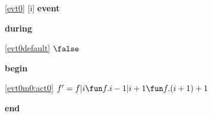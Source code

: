 \noindent \ref{evt0} [i] \textbf{event}
\begin{block}
\item \textbf{during}
\begin{block}
\item[ \eqref{evt0default} ]$\false $ %
\end{block}
\item \textbf{begin}
\begin{block}
\item[ \eqref{evt0m0:act0} ]$f' = f | i \fun f.i - 1 | i+1 \fun f.(i+1) +1 $ %
\end{block}
\item \textbf{end} \\
\end{block}
